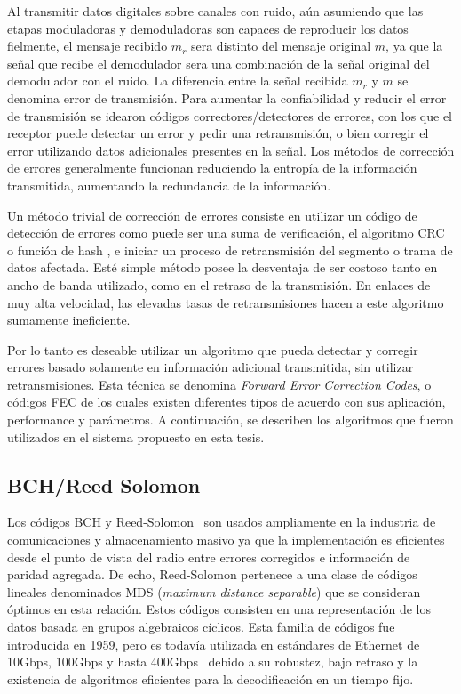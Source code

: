 Al transmitir datos digitales sobre canales con ruido, aún asumiendo que las etapas moduladoras y demoduladoras son capaces de reproducir los datos fielmente, el mensaje recibido $m_r$ sera distinto del mensaje original $m$, ya que la señal que recibe el demodulador sera una combinación de la señal original del demodulador con el ruido. La diferencia entre la señal recibida $m_r$ y $m$ se denomina error de transmisión. Para aumentar la confiabilidad y reducir el error de transmisión se idearon códigos correctores/detectores de errores, con los que el receptor puede detectar un error y pedir una retransmisión, o bien corregir el error utilizando datos adicionales presentes en la señal. Los métodos de corrección de errores generalmente funcionan reduciendo la entropía de la información transmitida, aumentando la redundancia de la información.

Un método trivial de corrección de errores consiste en utilizar un código de detección de errores como puede ser una suma de verificación, el algoritmo CRC o función de hash \cite{Menezes:1996:HAC:548089}, e iniciar un proceso de retransmisión del segmento o trama de datos afectada. Esté simple método posee la desventaja de ser costoso tanto en ancho de banda utilizado, como en el retraso de la transmisión. En enlaces de muy alta velocidad, las elevadas tasas de retransmisiones hacen a este algoritmo sumamente ineficiente.

Por lo tanto es deseable utilizar un algoritmo que pueda detectar y corregir errores basado solamente en información adicional transmitida, sin utilizar retransmisiones. Esta técnica se denomina \textsl{Forward Error Correction Codes}, o códigos FEC \cite{Moon:05} de los cuales existen diferentes tipos de acuerdo con sus aplicación, performance y parámetros. A continuación, se describen los algoritmos que fueron utilizados en el sistema propuesto en esta tesis.

\subsection{BCH/Reed Solomon}
Los códigos BCH y Reed-Solomon~\cite{reed1960polynomial} son usados ampliamente en la industria de comunicaciones y almacenamiento masivo ya que la implementación es eficientes desde el punto de vista del radio entre errores corregidos e información de paridad agregada. De echo, Reed-Solomon pertenece a una clase de códigos lineales denominados MDS (\textit{maximum distance separable}) que se consideran óptimos en esta relación. Estos códigos consisten en una representación de los datos basada en grupos algebraicos cíclicos. 
Esta familia de códigos fue introducida en 1959, pero es todavía utilizada en estándares de Ethernet de 10Gbps, 100Gbps y hasta 400Gbps~\cite{liforward} debido a su robustez, bajo retraso y la existencia de algoritmos eficientes para la decodificación en un tiempo fijo.

